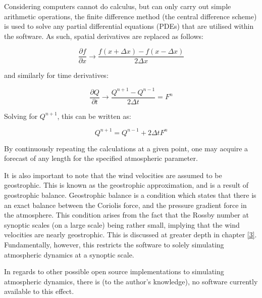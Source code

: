 Considering computers cannot do calculus, but can only carry out simple arithmetic operations, the finite difference method (the central difference scheme) is used to solve any partial differential equations (PDEs) that are utilised within the software. As such, spatial derivatives are replaced as follows:

\begin{equation}
    \frac{\partial f}{\partial x} \rightarrow \frac{f(x + \Delta x) - f(x - \Delta x)}{2 \Delta x}
\end{equation}

and similarly for time derivatives: 

\begin{equation}
    \frac{\partial Q}{\partial t} \rightarrow \frac{Q^{n+1} - Q^{n-1}}{2 \Delta t} = F^{n}
\end{equation}

Solving for $Q^{n+1}$, this can be written as:

\begin{equation}
    Q^{n+1} = Q^{n-1} + 2 \Delta t F^{n}
\end{equation}

By continuously repeating the calculations at a given point, one may acquire a forecast of any length for the specified atmospheric parameter\cite{nwp}.

It is also important to note that the wind velocities are assumed to be geostrophic. This is known as the geostrophic approximation, and is a result of geostrophic balance. Geostrophic balance is a condition which states that there is an exact balance between the Coriolis force, and the pressure gradient force in the atmosphere. This condition arises from the fact that the Rossby number at synoptic scales (on a large scale) being rather small, implying that the wind velocities are nearly geostrophic\cite{UiO}. This is discussed at greater depth in chapter \ref{3}. Fundamentally, however, this restricts the software to solely simulating atmospheric dynamics at a synoptic scale.

In regards to other possible open source implementations to simulating atmospheric dynamics, there is (to the author's knowledge), no software currently available to this effect.